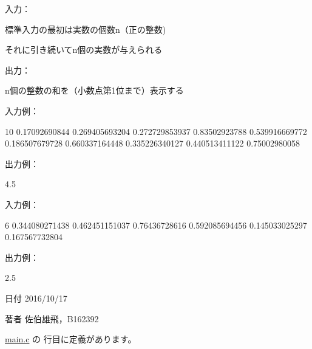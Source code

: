 入力：
\begin{DoxyItemize}
\item 標準入力の最初は実数の個数n（正の整数)
\item それに引き続いてn個の実数が与えられる
\end{DoxyItemize}

出力：
\begin{DoxyItemize}
\item n個の整数の和を（小数点第1位まで）表示する
\end{DoxyItemize}

入力例： \begin{DoxyVerb}10 0.17092690844 0.269405693204 0.272729853937 0.83502923788 0.539916669772
0.186507679728 0.660337164448 0.335226340127 0.440513411122 0.75002980058
\end{DoxyVerb}
 出力例： \begin{DoxyVerb}4.5
\end{DoxyVerb}
 入力例： \begin{DoxyVerb}6 0.344080271438 0.462451151037 0.76436728616 0.592085694456 0.145033025297
0.167567732804
\end{DoxyVerb}
 出力例： \begin{DoxyVerb}2.5
\end{DoxyVerb}
 \begin{DoxyDate}{日付}
2016/10/17 
\end{DoxyDate}
\begin{DoxyAuthor}{著者}
佐伯雄飛，\-B162392 
\end{DoxyAuthor}


 \hyperlink{main_8c_source}{main.\-c} の  行目に定義があります。


